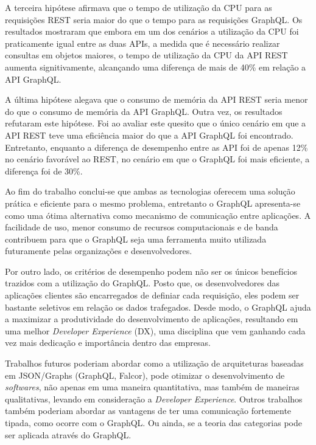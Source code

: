 A terceira hipótese afirmava que o tempo de utilização da CPU para as requisições REST seria maior do que o tempo para as requisições GraphQL. Os resultados mostraram que embora em um dos cenários a utilização da CPU foi praticamente igual entre as duas APIs, a medida que é necessário realizar consultas em objetos maiores, o tempo de utilização da CPU da API REST aumenta signitivamente, alcançando uma diferença de mais de 40\% em relação a API GraphQL.

A última hipótese alegava que o consumo de memória da API REST seria menor do que o consumo de memória da API GraphQL. Outra vez, os resultados refutaram este hipótese. Foi ao avaliar este quesito que o único cenário em que a API REST teve uma eficiência maior do que a API GraphQL foi encontrado. Entretanto, enquanto a diferença de desempenho entre as API foi de apenas 12\% no cenário favorável ao REST, no cenário em que o GraphQL foi mais eficiente, a diferença foi de 30\%. 

Ao fim do trabalho conclui-se que ambas as tecnologias oferecem uma solução prática e eficiente para o mesmo problema, entretanto o GraphQL apresenta-se como uma ótima alternativa como mecanismo de comunicação entre aplicações. A facilidade de uso, menor consumo de recursos computacionais e de banda contribuem para que o GraphQL seja uma ferramenta muito utilizada futuramente pelas organizações e desenvolvedores. 

Por outro lado, os critérios de desempenho podem não ser os únicos benefícios trazidos com a utilização do GraphQL. Posto que, os desenvolvedores das aplicações clientes são encarregados de definiar cada requisição, eles podem ser bastante seletivos em relação os dados trafegados. Desde modo, o GraphQL ajuda a maximizar a produtividade do desenvolvimento de aplicações, resultando em uma melhor \textit{Developer Experience} (DX), uma disciplina que vem ganhando cada vez mais dedicação e importância dentro das empresas.

Trabalhos futuros poderiam abordar como a utilização de arquiteturas baseadas em JSON/Graphs (GraphQL, Falcor), pode otimizar o desenvolvimento de \textit{softwares}, não apenas em uma maneira quantitativa, mas também de maneiras qualitativas, levando em consideração a \textit{Developer Experience}. Outros trabalhos também poderiam abordar as vantagens de ter uma comunicação fortemente tipada, como ocorre com o GraphQL. Ou ainda, se a teoria das categorias pode ser aplicada através do GraphQL.
